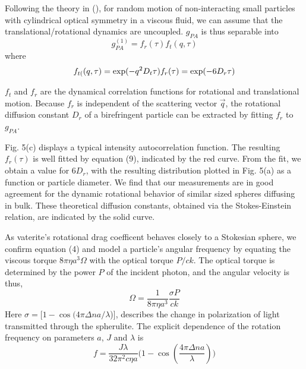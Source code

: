 {Following the theory in (), for random motion of non-interacting small particles with cylindrical optical symmetry in a viscous fluid, we can assume that the translational/rotational
dynamics are uncoupled.  $g_{PA}$ is thus separable into 
$$
g_{PA}^{(1)}=f_{r}(\tau)f_{t}(q,\tau)
$$
 where 
\begin{equation}
f_{t(}(q,\tau)=\exp(-q^{2}D_{t}\tau)$$
$$f_{r}(\tau)=\exp(-6D_{r}\tau)
\end{equation}

$f_{t}$ and $f_{r}$ are the dynamical correlation functions for rotational and translational motion. Because $f_{r}$  is independent of the scattering vector $\vec{q}$, the rotational diffusion  constant $D_{r}$ of a birefringent particle can be extracted by fitting $f_{r}$ to  $g_{PA}$. 

Fig. 5(c) displays a typical intensity autocorrelation function. The resulting $f_{r}(\tau)$ is well fitted by equation (9), indicated by the red curve. From the fit, we obtain a value for 6$D_{r}$, with the resulting distribution plotted in Fig. 5(a) as a function or particle diameter. We find that our measurements are in good agreement for the dynamic rotational behavior of similar sized spheres diffusing in bulk. These theoretical diffusion constants, obtained via the Stokes-Einstein relation, are indicated by the solid curve.

As vaterite's rotational drag coefficent behaves closely to a Stokesian
sphere, we confirm equation (4) and model a particle's angular frequency by equating the viscous torque $8\pi\eta a^{3}\Omega$ with the optical torque $P/ck$. The optical torque is determined by the power $P$ of the incident photon, and the angular velocity is thus,
\[
\Omega=\frac{1}{8\pi\eta a^{3}}\frac{\sigma P}{ck}
\]
Here $\sigma=[1-\cos(4\pi\Delta na/\lambda$){]}, describes the change in polarization of light transmitted through the spherulite. The explicit dependence of the rotation frequency on parameters $a$, $J$ and $\lambda$ is 
\begin{equation}
f=\frac{J\lambda}{32\pi^{2}c\eta a}\bigg(1-\cos(\frac{4\pi\Delta na}{\lambda})\bigg)
\end{equation}

}
